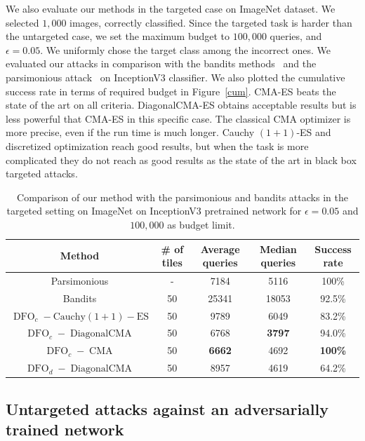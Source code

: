 We also evaluate our methods in the targeted case on ImageNet dataset. We selected $1,000$ images, correctly classified. Since the targeted task is harder than the untargeted case, we set the maximum budget to $100,000$ queries, and  $\epsilon=0.05$. We uniformly chose the target class among the incorrect ones. We evaluated our attacks in comparison with the bandits methods~\citep{ilyas2018prior} and the parsimonious attack~\citep{moon19aparsimonous} on InceptionV3 classifier. We also plotted the cumulative success rate in terms of required budget in Figure~\ref{cum}. CMA-ES beats the state of the art on all criteria. DiagonalCMA-ES obtains acceptable results but is less powerful that CMA-ES in this specific case. The classical CMA optimizer is more precise, even if the run time is much longer. Cauchy $(1+1)$-ES and discretized optimization reach good results, but when the task is more complicated they do not reach as good results as the state of the art in black box targeted attacks.
\begin{table}[t]
\caption{Comparison of our method with the parsimonious and bandits attacks in the targeted setting on ImageNet  on InceptionV3 pretrained network for $\epsilon=0.05$ and $100,000$ as budget limit.}
\label{targeted_comp}
\begin{center}
\begin{tabular}{cc|cc|c}
\textbf{Method} &\textbf{ \# of tiles }& \textbf{ Average queries} & \textbf{Median queries} & \textbf{Success rate}\\
 \hline
Parsimonious & - & 7184 &5116& 100\% \\
Bandits &50 &  25341&18053&92.5\% \\
\hline
$\operatorname{DFO}_c-\operatorname{Cauchy (1+1)-ES}$ &50 & 9789 & 6049& 83.2\% \\
$\operatorname{DFO}_c-\operatorname{Diagonal CMA}$& 50 & 6768& {\bf{3797}} & 94.0\%\\
$\operatorname{DFO}_c-\operatorname{CMA}$& 50 & {\bf{6662}} &4692& {\bf{100\%}}\\
\hline
$\operatorname{DFO}_d-\operatorname{Diagonal CMA}$ & 50 & 8957 & 4619 & 64.2\%\\
\end{tabular}
\end{center}
\end{table}

\subsection{Untargeted attacks against an adversarially trained network}

